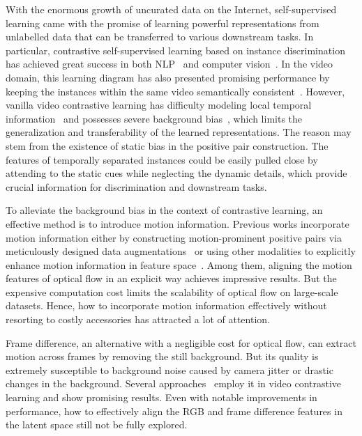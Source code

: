 \documentclass[sigconf,screen]{acmart}
\begin{document}
With the enormous growth of uncurated data on the Internet, self-supervised learning came with the promise of learning powerful representations from unlabelled data that can be transferred to various downstream tasks. In particular, contrastive self-supervised learning based on instance discrimination~\cite{InstDisc} has achieved great success in both NLP~\cite{Bert,GPT3} and computer vision~\cite{SimCLR,MoCov1,CLIP}. In the video domain, this learning diagram has also presented promising performance by keeping the instances within the same video semantically consistent~\cite{ALargeScale,CVRL}. However, vanilla video contrastive learning has difficulty modeling local temporal information~\cite{TCLR,Static} and possesses severe background bias~\cite{FAME,BE}, which limits the generalization and transferability of the learned representations. The reason may stem from the existence of static bias in the positive pair construction.
The features of temporally separated instances could be easily pulled close by attending to the static cues while neglecting the dynamic details, which provide crucial information for discrimination and downstream tasks.

To alleviate the background bias in the context of contrastive learning, an effective method is to introduce motion information. Previous works incorporate motion information either by constructing motion-prominent positive pairs via meticulously designed data augmentations~\cite{FAME,DSM,BE} or using other modalities to explicitly enhance motion information in feature space~\cite{Mfocused,Msensitive,MACLR}. Among them, aligning the motion features of optical flow in an explicit way achieves impressive results. But the expensive computation cost limits the scalability of optical flow on large-scale datasets. Hence, how to incorporate motion information effectively without resorting to costly accessories has attracted a lot of attention.

Frame difference, an alternative with a negligible cost for optical flow, can extract motion across frames by removing the still background. But its quality is extremely susceptible to background noise caused by camera jitter or drastic changes in the background. Several approaches~\cite{Dual,Static,interintra,improvedIIC} employ it in video contrastive learning and show promising results. Even with notable improvements in performance, how to effectively align the RGB and frame difference features in the latent space still not be fully explored. 
\end{document}

